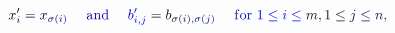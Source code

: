 \documentclass[12pt]{article}
\begin{document}
\makeatletter
\renewcommand*{\@textcolor}[3]{%
  \protect\leavevmode
  \begingroup
    \color#1{#2}#3%
  \endgroup
}
\makeatother
\begin{displaymath}
\mathcolor[RGB]{0,0,15}{x} _ { \mathcolor[RGB]{0,0,30}{i} } ^ { \mathcolor[RGB]{0,0,45}{\prime} } \mathcolor[RGB]{0,0,60}{=} \mathcolor[RGB]{0,0,75}{x} _ { \mathcolor[RGB]{0,0,90}{\sigma} \mathcolor[RGB]{0,0,105}{(} \mathcolor[RGB]{0,0,120}{i} \mathcolor[RGB]{0,0,135}{)} } \quad \mathrm { ~ \mathcolor[RGB]{0,0,150}{a} \mathcolor[RGB]{0,0,165}{n} \mathcolor[RGB]{0,0,180}{d} ~ } \quad \mathcolor[RGB]{0,0,195}{b} _ { \mathcolor[RGB]{0,0,210}{i} \mathcolor[RGB]{0,0,225}{,} \mathcolor[RGB]{0,0,240}{j} } ^ { \mathcolor[RGB]{0,0,255}{\prime} } \mathcolor[RGB]{0,15,0}{=} \mathcolor[RGB]{0,15,15}{b} _ { \mathcolor[RGB]{0,15,30}{\sigma} \mathcolor[RGB]{0,15,45}{(} \mathcolor[RGB]{0,15,60}{i} \mathcolor[RGB]{0,15,75}{)} \mathcolor[RGB]{0,15,90}{,} \mathcolor[RGB]{0,15,105}{\sigma} \mathcolor[RGB]{0,15,120}{(} \mathcolor[RGB]{0,15,135}{j} \mathcolor[RGB]{0,15,150}{)} } \quad \mathrm { ~ \mathcolor[RGB]{0,15,165}{f} \mathcolor[RGB]{0,15,180}{o} \mathcolor[RGB]{0,15,195}{r} ~ } \mathcolor[RGB]{0,15,210}{1} \mathcolor[RGB]{0,15,225}{\le} \mathcolor[RGB]{0,15,240}{i} \mathcolor[RGB]{0,15,255}{\le} \mathcolor[RGB]{0,30,0}{m} \mathcolor[RGB]{0,30,15}{,} \mathcolor[RGB]{0,30,30}{1} \mathcolor[RGB]{0,30,45}{\le} \mathcolor[RGB]{0,30,60}{j} \mathcolor[RGB]{0,30,75}{\le} \mathcolor[RGB]{0,30,90}{n} \mathcolor[RGB]{0,30,105}{,}
\end{displaymath}
\end{document}
